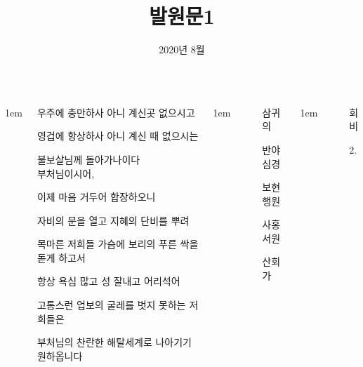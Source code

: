\documentclass[	20pt, 
							a1paper, 
							portrait, %
							margin=0mm, %
							innermargin=10mm,  		%
							colspace=5mm, 
							subcolspace=0mm
							]{tikzposter}
\title{발원문1 }
\author{ 2020년 8월 }
\institute{부처님 앞에 불자로서 크고 바른 다짐을 고합니다}
\begin{document}
	\maketitle

	\begin{columns}


			{
					\setlength{\leftmargini}{7em}
					\setlength{\labelsep} {1em}
				\begin{LARGE}

우주에 충만하사 아니 계신곳 없으시고

영겁에 항상하사 아니 계신 때 없으시는

불보살님께 돌아가나이다
\\


부처님이시어,

이제 마음 거두어 합장하오니

자비의 문을 열고 지혜의 단비를 뿌려 

목마른 저희들 가슴에 보리의 푸른 싹을 돋게 하고서

항상 욕심 많고 성 잘내고 어리석어

고통스런 업보의 굴레를 벗지 못하는 저희들은

부처님의 찬란한 해탈세계로 나아기기 원하옵니다


				\end{LARGE}
			}

			{
					\setlength{\leftmargini}{7em}
					\setlength{\labelsep} {1em}
				\begin{LARGE}
					\begin{itemize}
					\item [] 삼귀의
					\item [] 반야심경
					\item [] 보현행원
					\item [] 사홍서원
					\item [] 산회가
					\end{itemize}
				\end{LARGE}
			}


			{
					\setlength{\leftmargini}{4em}
					\setlength{\labelsep} {1em}
				\begin{LARGE}
					\begin{itemize}
					\item [회비]
					\item [2.] 
					\end{itemize}
				\end{LARGE}
			}




\end{columns}
\end{document}
